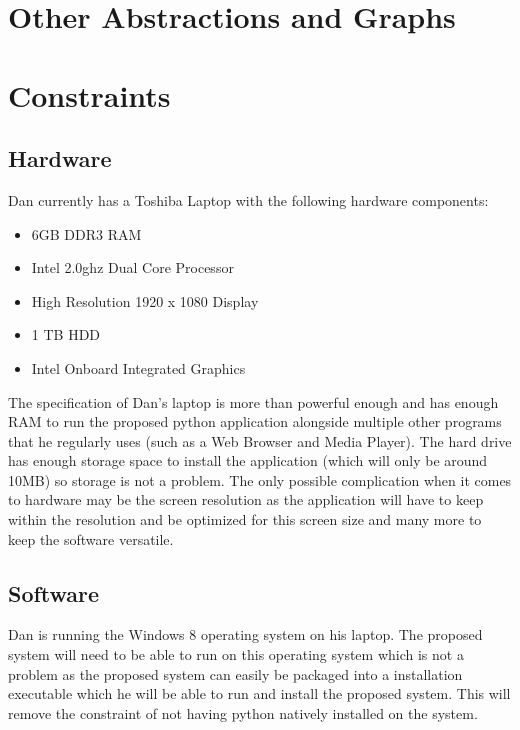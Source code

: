 \section{Other Abstractions and Graphs}

\section{Constraints}

\subsection{Hardware}

\begin{flushleft}
	Dan currently has a Toshiba Laptop with the following hardware components:
	
	\begin{itemize}
		\item 6GB DDR3 RAM
		\item Intel 2.0ghz Dual Core Processor
		\item High Resolution 1920 x 1080 Display
		\item 1 TB HDD
		\item Intel Onboard Integrated Graphics
	\end{itemize}

	The specification of Dan's laptop is more than powerful enough and has enough RAM to run the proposed python application alongside multiple other programs that he regularly uses (such as a Web Browser and Media Player). The hard drive has enough storage space to install the application (which will only be around 10MB) so storage is not a problem. The only possible complication when it comes to hardware may be the screen resolution as the application will have to keep within the resolution and be optimized for this screen size and many more to keep the software versatile.
\end{flushleft}

\subsection{Software}

\begin{flushleft}
	Dan is running the Windows 8 operating system on his laptop. The proposed system will need to be able to run on this operating system which is not a problem as the proposed system can easily be packaged into a installation executable which he will be able to run and install the proposed system. This will remove the constraint of not having python natively installed on the system.

\end{flushleft}

